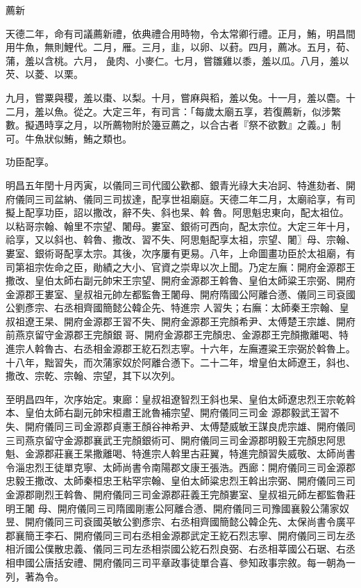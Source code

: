 \begin{pinyinscope}
 薦新



 天德二年，命有司議薦新禮，依典禮合用時物，令太常卿行禮。正月，鮪，明昌間用牛魚，無則鯉代。二月，雁。三月，韭，以卵、以葑。四月，薦冰。五月，荀、蒲，羞以含桃。六月，
 彘肉、小麥仁。七月，嘗雛雞以黍，羞以瓜。八月，羞以芡、以菱、以栗。



 九月，嘗粟與稷，羞以棗、以梨。十月，嘗麻與稻，羞以兔。十一月，羞以麕。十二月，羞以魚。從之。大定三年，有司言：「每歲太廟五享，若復薦新，似涉繁數。擬遇時享之月，以所薦物附於籩豆薦之，以合古者『祭不欲數』之義。」制可。牛魚狀似鮪，鮪之類也。



 功臣配享。



 明昌五年閏十月丙寅，以儀同三司代國公歡都、銀青光祿大夫冶訶、特進劾者、開府儀同三司盆納、儀同三司拔達，配享世祖廟庭。天德二年二月，太廟祫享，有司擬上配享功臣，詔以撒改，辭不失、斜也杲、斡
 魯。阿思魁忠東向，配太祖位。以粘哥宗翰、翰里不宗望、闍母。婁室、銀術可西向，配太宗位。大定三年十月，祫享，又以斜也、斡魯、撒改、習不失、阿思魁配享太祖，宗望、闍〗母、宗翰、婁室、銀術哥配享太宗。其後，次序屢有更易。八年，上命圖畫功臣於太祖廟，有司第祖宗佐命之臣，勛績之大小、官資之崇卑以次上聞。乃定左廡：開府金源郡王撒改、皇伯太師右副元帥宋王宗望、開府金源郡王斡魯、皇伯太師粱王宗弼、開府金源郡王婁室、皇叔祖元帥左都監魯王闍母、開府隋國公阿離合懣、儀同三司袞國公劉彥宗、右丞相齊國簡懿公韓企先、特進宗
 人習失；右廡：太師秦王宗翰、皇叔祖遼王杲、開府金源郡王習不失、開府金源郡王完顏希尹、太傅楚王宗雄、開府前燕京留守金源郡王完顏銀哥、開府金源郡王完顏忠、金源郡王完顏撒離喝、特進宗人斡魯古、右丞相金源郡王紇石烈志寧。十六年，左廡遷粱王宗弼於斡魯上。十八年，黜習失，而次蒲家奴於阿離合懣下。二十二年，增皇伯太師遼王，斜也、撒改、宗乾、宗翰、宗望，其下以次列。



 至明昌四年，次序始定。東廊：皇叔祖遼智烈王斜也杲、皇伯太師遼忠烈王宗乾斡本、皇伯太師右副元帥宋桓肅王訛魯補宗望、開府儀同三司金
 源郡毅武王習不失、開府儀同三司金源郡貞憲王顏谷神希尹、太傅楚威敏王謀良虎宗雄、開府儀同三司燕京留守金源郡襄武王完顏銀術可、開府儀同三司金源郡明毅王完顏忠阿思魁、金源郡莊襄王杲撒離喝、特進宗人斡里古莊翼，特進完顏習失威敬、太師尚書令淄忠烈王徒單克寧、太師尚書令南陽郡文康王張浩。西廊：開府儀同三司金源郡忠毅王撒改、太師秦桓忠王粘罕宗翰、皇伯太師粱忠烈王斡出宗弼、開府儀同三司金源郡剛烈王斡魯、開府儀同三司金源郡莊義王完顏婁室、皇叔祖元師左都監魯莊明王闍
 母、開府儀同三司隋國剛憲公阿離合懣、開府儀同三司豫國襄毅公蒲家奴昱、開府儀同三司袞國英敏公劉彥宗、右丞相齊國簡懿公韓企先、太保尚書令廣平郡襄簡王李石、開府儀同三司右丞相金源郡武定王紇石烈志寧、開府儀同三司左丞相沂國公僕散忠義、儀同三司左丞相崇國公紇石烈良弼、右丞相莘國公石琚、右丞相申國公唐括安禮、開府儀同三司平章政事徒單合喜、參知政事宗敘。每一朝為一列，著為令。




\end{pinyinscope}
